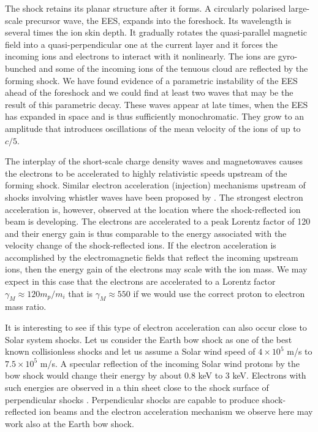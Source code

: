 \documentclass[structabstract]{aa}
\begin{document}
The shock retains its planar structure after it forms. A circularly polarised 
large-scale precursor wave, the EES, expands into the foreshock. Its 
wavelength is several times the ion skin depth. It gradually rotates the 
quasi-parallel magnetic field into a quasi-perpendicular one at the current 
layer and it forces the incoming ions and electrons to interact with it
nonlinearly. The ions are gyro-bunched and some of the incoming ions of
the tenuous cloud are reflected by the forming shock. We have found evidence 
of a parametric instability \citep{Instability} of the EES ahead of the 
foreshock and we could find at least two waves that may be the result of this 
parametric decay. These waves appear at late times, when the EES has expanded 
in space and is thus sufficiently monochromatic. They grow to an amplitude 
that introduces oscillations of the mean velocity of the ions of up to $c/5$. 

The interplay of the short-scale charge density waves and magnetowaves causes 
the electrons to be accelerated to highly relativistic speeds upstream of the 
forming shock. Similar electron acceleration (injection) mechanisms upstream 
of shocks involving whistler waves have been proposed by 
\citet{Oblique3,Injection3,Gyrosurf}. The strongest electron acceleration is, 
however, observed at the location where the shock-reflected ion beam is 
developing. The electrons are accelerated to a peak Lorentz factor of 120 and 
their energy gain is thus comparable to the energy associated with the 
velocity change of the shock-reflected ions. If the electron acceleration is 
accomplished by the electromagnetic fields that reflect the incoming upstream 
ions, then the energy gain of the electrons may scale with the ion mass. We 
may expect in this case that the electrons are accelerated to a Lorentz factor 
$\gamma_M \approx 120 m_p / m_i$ that is $\gamma_M \approx 550$ if we would
use the correct proton to electron mass ratio.

It is interesting to see if this type of electron acceleration can also occur 
close to Solar system shocks. Let us consider the Earth bow shock as one of 
the best known collisionless shocks and let us assume a Solar wind speed of 
$4 \times 10^5$ m/s to $7.5 \times 10^5$ m/s. A specular reflection of the 
incoming Solar wind protons by the bow shock would change their energy by 
about 0.8 keV to 3 keV. Electrons with such energies are observed in a thin 
sheet close to the shock surface of perpendicular shocks \citep{BowShock}. 
Perpendicular shocks are capable to produce shock-reflected ion beams
\citep{Shock6} and the electron acceleration mechanism we observe here
may work also at the Earth bow shock. 
   
\end{document}

